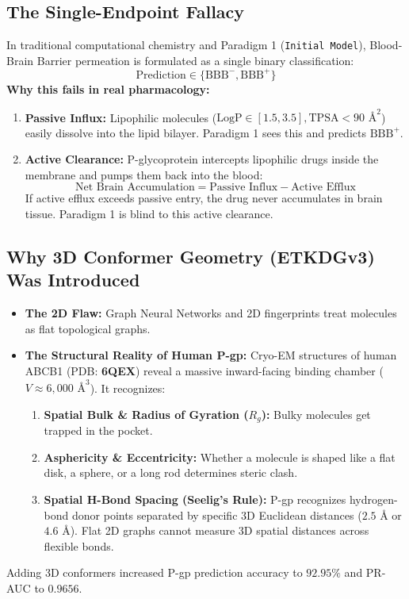 \documentclass[11pt,a4paper]{article}
\begin{document}
\begin{mathspecbox}
\subsection{The Single-Endpoint Fallacy}
In traditional computational chemistry and Paradigm 1 (\texttt{Initial Model}), Blood-Brain Barrier permeation is formulated as a single binary classification:
\begin{equation}
\text{Prediction} \in \{\text{BBB}^-, \text{BBB}^+\}
\end{equation}
\textbf{Why this fails in real pharmacology:}
\begin{enumerate}[leftmargin=*]
    \item \textbf{Passive Influx:} Lipophilic molecules ($\text{LogP} \in [1.5, 3.5], \text{TPSA} < 90\text{ \AA}^2$) easily dissolve into the lipid bilayer. Paradigm 1 sees this and predicts $\text{BBB}^+$.
    \item \textbf{Active Clearance:} P-glycoprotein intercepts lipophilic drugs inside the membrane and pumps them back into the blood:
    \begin{equation}
    \text{Net Brain Accumulation} = \text{Passive Influx} - \text{Active Efflux}
    \end{equation}
    If active efflux exceeds passive entry, the drug never accumulates in brain tissue. Paradigm 1 is blind to this active clearance.
\end{enumerate}

\subsection{Why 3D Conformer Geometry (ETKDGv3) Was Introduced}
\begin{itemize}[leftmargin=*]
    \item \textbf{The 2D Flaw:} Graph Neural Networks and 2D fingerprints treat molecules as flat topological graphs.
    \item \textbf{The Structural Reality of Human P-gp:} Cryo-EM structures of human ABCB1 (PDB: \textbf{6QEX}) reveal a massive inward-facing binding chamber ($V \approx 6,000\text{ \AA}^3$). It recognizes:
    \begin{enumerate}
        \item \textbf{Spatial Bulk \& Radius of Gyration ($R_g$):} Bulky molecules get trapped in the pocket.
        \item \textbf{Asphericity \& Eccentricity:} Whether a molecule is shaped like a flat disk, a sphere, or a long rod determines steric clash.
        \item \textbf{Spatial H-Bond Spacing (Seelig's Rule):} P-gp recognizes hydrogen-bond donor points separated by specific 3D Euclidean distances ($2.5\text{ \AA}$ or $4.6\text{ \AA}$). Flat 2D graphs cannot measure 3D spatial distances across flexible bonds.
    \end{enumerate}
\end{itemize}
Adding 3D conformers increased P-gp prediction accuracy to \textbf{$92.95\%$} and PR-AUC to \textbf{$0.9656$}.


\end{mathspecbox}
\end{document}
